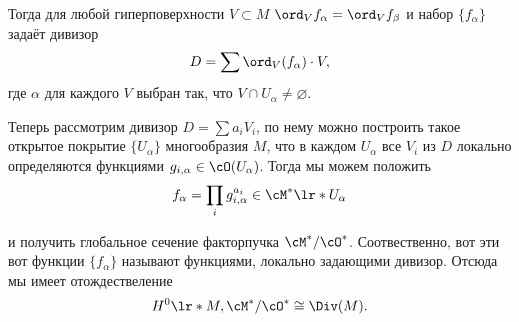 	Тогда для любой гиперповерхности $V \subset M$ $\ord_{V}{f_{\alpha}} = \ord_{V}{f_{\beta}}$ и набор $\{ f_{\alpha} \}$ задаёт дивизор 
	\[
		D = \sum \ord_{V}(f_{\alpha}) \cdot V,
	\]
	где $\alpha$ для каждого $V$ выбран так, что $V \cap U_{\alpha} \neq \varnothing$. 


	Теперь рассмотрим дивизор $D = \sum a_i V_i$, по нему можно построить такое открытое покрытие $\{ U_{\alpha} \}$ многообразия $M$, что в каждом $U_{\alpha}$ все $V_i$ из $D$ локально определяются функциями $g_{i, \alpha} \in \cO(U_{\alpha})$. Тогда мы можем положить 
	\[
		f_{\alpha} = \prod_{i} g_{i, \alpha}^{a_i} \in \cM^{*}\lr*{U_{\alpha}}
	\]

	и получить глобальное сечение факторпучка $\cM^*/\cO^*$. Соотвественно, вот эти вот функции $\{ f_{\alpha} \}$ называют функциями, локально задающими дивизор. Отсюда мы имеет отождествеление 
	\[
		H^{0}\lr*{M, \cM^{*}/\cO^{*}} \cong \Div(M).
	\]

	

